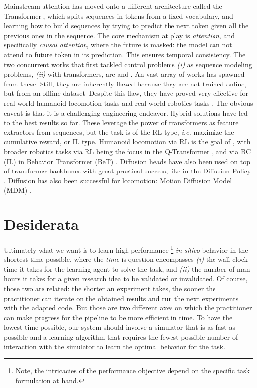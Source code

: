 \documentclass[12pt,a4paper]{article}
\begin{document}
Mainstream attention has moved onto a different architecture called
the Transformer \cite{Vaswani2017-lk},
which splits sequences in tokens from a fixed vocabulary,
and learning how to build sequences by trying to predict the next token given all the previous
ones in the sequence.
The core mechanism at play is \emph{attention}, and specifically \emph{causal attention}, where
the future is masked: the model can not attend to future token in its prediction.
This ensures temporal consistency.
The two concurrent works that first tackled control problems
\textit{(i)} as sequence modeling problems,
\textit{(ii)} with transformers, are
\cite{Chen2021-qq} and \cite{Janner2021-wn}.
An vast array of works has spawned from these.
Still, they are inherently flawed because they are not trained online, but from an offline dataset.
Despite this flaw, they have proved very effective for real-world humanoid locomotion tasks
\cite{Radosavovic2024-xl}
and real-world robotics tasks \cite{Brohan2022-vs, Brohan2023-rm}.
The obvious caveat is that it is a challenging engineering endeavor.
Hybrid solutions have led to the best results so far.
These leverage the power of transformers as feature extractors from sequences, but the task is of
the RL type, \textit{i.e.} maximize the cumulative reward, or IL type.
Humanoid locomotion via RL is the goal of \cite{Radosavovic2024-dm},
with broader robotics tasks via RL being the focus in the Q-Transformer \cite{Chebotar2023-hq},
and via BC (IL) in Behavior Transformer (BeT) \cite{Shafiullah2022-ux}.
Diffusion heads have also been used on top of transformer backbones with great practical success,
like in the Diffusion Policy \cite{Chi2023-is}.
Diffusion has also been successful for locomotion:
Motion Diffusion Model (MDM) \cite{Tevet2023-pv}.

\section{Desiderata}
\label{s:desiderata}

Ultimately what we want is to learn high-performance \footnote{Note, the intricacies of the
performance objective depend on the specific task formulation at hand.}
\textit{in silico} behavior in the shortest
time possible, where the \textit{time} is question encompasses
\textit{(i)} the wall-clock time it takes for the learning agent to solve the task, and
\textit{(ii)} the number of man-hours it takes for a given research idea to be validated
or invalidated.
Of course, those two are related: the shorter an experiment takes, the sooner the practitioner can
iterate on the obtained results and run the next experiments with the adapted code.
But those are two different axes on which the practitioner can make progress for the pipeline to
be more efficient in time.
To have the lowest time possible, our system should involve a simulator that is as fast as possible
and a learning algorithm that requires the fewest possible number of interaction with the simulator
to learn the optimal behavior for the task.
\end{document}
